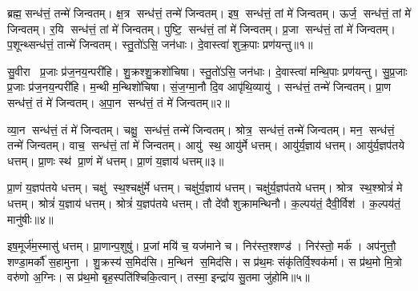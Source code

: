 



\setcounter{anuvakam}{0}
ब्रह्म॒ सन्ध॑त्तं॒ तन्मे॑ जिन्वतम्। क्ष॒त्र सन्ध॑त्तं॒ तन्मे॑ जिन्वतम्। इष॒ सन्ध॑त्तं॒ तां मे॑ जिन्वतम्। ऊर्ज॒ सन्ध॑त्तं॒ तां मे॑ जिन्वतम्। र॒यि सन्ध॑त्तं॒ तां मे॑ जिन्वतम्। पुष्टि॒ सन्ध॑त्तं॒ तां मे॑ जिन्वतम्। प्र॒जा सन्ध॑त्तं॒ तां मे॑ जिन्वतम्। प॒शून्थ्सन्ध॑त्तं॒ तान्मे॑ जिन्वतम्। स्तु॒तो॑ऽसि॒ जन॑धाः। दे॒वास्त्वा॑ शुक्र॒पाः प्रण॑यन्तु॥१॥

सु॒वीरा प्र॒जाः प्र॑ज॒नय॒न्परी॑हि। शु॒क्रश्शु॒क्रशो॑चिषा। स्तु॒तो॑ऽसि॒ जन॑धाः। दे॒वास्त्वा॑ मन्थि॒पाः प्रण॑यन्तु। सु॒प्र॒जाः प्र॒जाः प्र॑ज॒नय॒न्परी॑हि। म॒न्थी म॒न्थिशो॑चिषा। सं॒ज॒ग्मा॒नौ दि॒व आपृ॑थि॒व्यायु॑। सन्ध॑त्तं॒ तन्मे॑ जिन्वतम्। प्रा॒ण सन्ध॑त्तं॒ तं मे॑ जिन्वतम्। अ॒पा॒न सन्ध॑त्तं॒ तं मे॑ जिन्वतम्॥२॥

व्या॒न सन्ध॑त्तं॒ तं मे॑ जिन्वतम्। चक्षु॒ सन्ध॑त्तं॒ तन्मे॑ जिन्वतम्। श्रोत्र॒ सन्ध॑त्तं॒ तन्मे॑ जिन्वतम्। मन॒ सन्ध॑त्तं॒ तन्मे॑ जिन्वतम्। वाच॒ सन्ध॑त्तं॒ तां मे॑ जिन्वतम्। आयु॑ स्थ॒ आयु॑र्मे धत्तम्। आयु॑र्य॒ज्ञाय॑ धत्तम्। आयु॑र्य॒ज्ञप॑तये धत्तम्। प्रा॒णः स्थ॑ प्रा॒णं मे॑ धत्तम्। प्रा॒णं य॒ज्ञाय॑ धत्तम्॥३॥

प्रा॒णं य॒ज्ञप॑तये धत्तम्। चक्षु॑ स्थ॒श्चक्षु॑र्मे धत्तम्। चक्षु॑र्य॒ज्ञाय॑ धत्तम्। चक्षु॑र्य॒ज्ञप॑तये धत्तम्। श्रोत्र स्थ॒श्श्रोत्रं॑ मे धत्तम्। श्रोत्रं॑ य॒ज्ञाय॑ धत्तम्। श्रोत्रं॑ य॒ज्ञप॑तये धत्तम्। तौ दे॑वौ शुक्रामन्थिनौ। क॒ल्पय॑तं॒ दैवी॒र्विश॑। क॒ल्पय॑तं॒ मानु॑षीः॥४॥

इष॒मूर्ज॑म॒स्मासु॑ धत्तम्। प्रा॒णान्प॒शुषु॑। प्र॒जां मयि॑ च॒ यज॑माने च। निर॑स्त॒श्शण्ड॑। निर॑स्तो॒ मर्क॑। अप॑नुत्तौ॒ शण्डा॒मर्कौ॑ स॒हामुना। शु॒क्रस्य॑ स॒मिद॑सि। म॒न्थिन॑ स॒मिद॑सि। स प्र॑थ॒मः संकृ॑तिर्वि॒श्वक॑र्मा। स प्र॑थ॒मो मि॒त्रो वरु॑णो अ॒ग्निः। स प्र॑थ॒मो बृह॒स्पति॑श्चिकि॒त्वान्। तस्मा॒ इन्द्रा॑य सु॒तमा जु॑होमि॥५॥\anuvakamend[न॒य॒न्त्व॒पा॒न सन्ध॑त्तं॒ तं मे॑ जिन्वतं प्रा॒णं य॒ज्ञाय॑ धत्तं॒ मानु॑षीर॒ग्निर्द्वे च॑॥ (ब्रह्म॑ क्ष॒त्रं तदिष॒मूर्ज र॒यिं पुष्टिं॑ प्र॒जां तां प॒शून्तान्थ्सन्ध॑त्तं॒ तत्प्रा॒णम॑पा॒नं व्या॒नं तं चक्षु॒श्श्रोत्रं॒ मन॒स्तद्वाचं॒ ताम्। इ॒षादि॒पञ्च॑के॒ वाचं॒ तां मे॑ प॒शून्थ्सन्ध॑त्तं॒ तान्मे प्रा॒णादि॒त्रित॑ये॒ तं मे॒ऽन्यत्र॒ तन्मे)]

